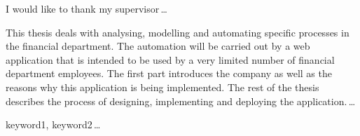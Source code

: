 \documentclass[12pt,oneside]{fithesis2}
\begin{document}
  \FrontMatter
    \ThesisTitlePage
    \begin{ThesisDeclaration}
      \DeclarationText
      \AdvisorName
    \end{ThesisDeclaration}
    \begin{ThesisThanks}
      I would like to thank my supervisor\,\dots
    \end{ThesisThanks}
    \begin{ThesisAbstract}
      This thesis deals with analysing, modelling and automating specific processes in the financial department. The automation will be carried out by a web application that is intended to be used by a very limited number of financial department employees. The first part introduces the company as well as the reasons why this application is being implemented. The rest of the thesis describes the process of designing, implementing and deploying the application.\,\dots
    \end{ThesisAbstract}
    \begin{ThesisKeyWords}
      keyword1, keyword2\,\dots
    \end{ThesisKeyWords}
    \tableofcontents
  
  \MainMatter
\end{document}
